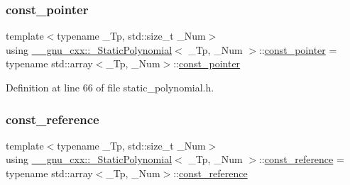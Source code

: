 \mbox{\label{class____gnu__cxx_1_1__StaticPolynomial_a906c0452a31199908a09949f1f90af9e}} 
\subsubsection{\texorpdfstring{const\+\_\+pointer}{const\_pointer}}
{\footnotesize\ttfamily template$<$typename \+\_\+\+Tp, std\+::size\+\_\+t \+\_\+\+Num$>$ \\
using \hyperlink{class____gnu__cxx_1_1__StaticPolynomial}{\+\_\+\+\_\+gnu\+\_\+cxx\+::\+\_\+\+Static\+Polynomial}$<$ \+\_\+\+Tp, \+\_\+\+Num $>$\+::\hyperlink{class____gnu__cxx_1_1__StaticPolynomial_a906c0452a31199908a09949f1f90af9e}{const\+\_\+pointer} =  typename std\+::array$<$\+\_\+\+Tp, \+\_\+\+Num$>$\+::\hyperlink{class____gnu__cxx_1_1__StaticPolynomial_a906c0452a31199908a09949f1f90af9e}{const\+\_\+pointer}}



Definition at line 66 of file static\+\_\+polynomial.\+h.

\mbox{\label{class____gnu__cxx_1_1__StaticPolynomial_a4cefddf230fb5882fa34d8c5f63c60bc}} 
\subsubsection{\texorpdfstring{const\+\_\+reference}{const\_reference}}
{\footnotesize\ttfamily template$<$typename \+\_\+\+Tp, std\+::size\+\_\+t \+\_\+\+Num$>$ \\
using \hyperlink{class____gnu__cxx_1_1__StaticPolynomial}{\+\_\+\+\_\+gnu\+\_\+cxx\+::\+\_\+\+Static\+Polynomial}$<$ \+\_\+\+Tp, \+\_\+\+Num $>$\+::\hyperlink{class____gnu__cxx_1_1__StaticPolynomial_a4cefddf230fb5882fa34d8c5f63c60bc}{const\+\_\+reference} =  typename std\+::array$<$\+\_\+\+Tp, \+\_\+\+Num$>$\+::\hyperlink{class____gnu__cxx_1_1__StaticPolynomial_a4cefddf230fb5882fa34d8c5f63c60bc}{const\+\_\+reference}}



